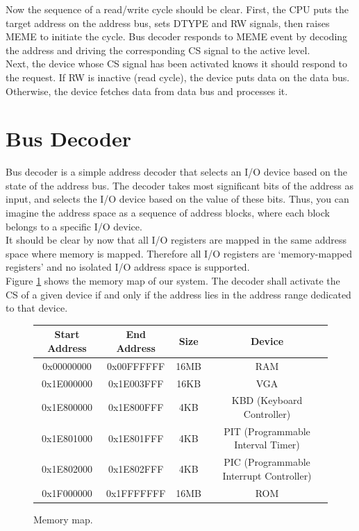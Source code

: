 \documentclass[oneside]{book}
\begin{document}
Now the sequence of a read/write cycle should be clear. First, the CPU puts
the target address on the address bus, sets DTYPE and RW signals, then raises
MEME to initiate the cycle. Bus decoder responds to MEME event by decoding
the address and driving the corresponding CS signal to the active level.\\

Next, the device whose CS signal has been activated knows it should respond to
the request. If RW is inactive (read cycle), the device puts data on the data
bus. Otherwise, the device fetches data from data bus and processes it.\\

\section{Bus Decoder}

Bus decoder is a simple address decoder that selects an I/O device based on
the state of the address bus. The decoder takes most significant bits of the
address as input, and selects the I/O device based on the value of these bits.
Thus, you can imagine the address space as a sequence of address blocks, where
each block belongs to a specific I/O device.\\

It should be clear by now that all I/O registers are mapped in the same
address space where memory is mapped. Therefore all I/O registers are
`memory-mapped registers' and no isolated I/O address space is supported.\\

Figure \ref{memmap} shows the memory map of our system. The decoder shall activate
the CS of a given device if and only if the address lies in the address range
dedicated to that device.

\begin{figure}[H]
\begin{center}
\begin{tabular}{|c|c|c|c|}

\hline \textbf{Start Address} & \textbf{End Address} &
       \textbf{Size} & \textbf{Device} \\

\hline 0x00000000 & 0x00FFFFFF & 16MB & RAM \\
\hline 0x1E000000 & 0x1E003FFF & 16KB & VGA \\
\hline 0x1E800000 & 0x1E800FFF &  4KB & KBD (Keyboard Controller) \\
\hline 0x1E801000 & 0x1E801FFF &  4KB & PIT (Programmable Interval Timer) \\
\hline 0x1E802000 & 0x1E802FFF &  4KB & PIC (Programmable Interrupt
                                                              Controller) \\
\hline 0x1F000000 & 0x1FFFFFFF & 16MB & ROM \\

\hline

\end{tabular}
\end{center}
\caption{Memory map.}
\label{memmap}
\end{figure}
\end{document}
